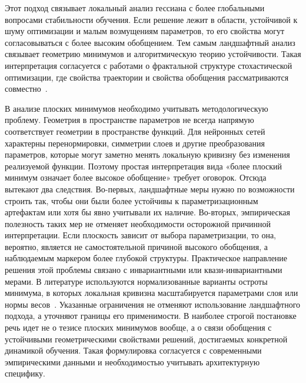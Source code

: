Этот подход связывает локальный анализ гессиана с более глобальными вопросами стабильности обучения.
Если решение лежит в области, устойчивой к шуму оптимизации и малым возмущениям параметров, то его свойства могут согласовываться с более высоким обобщением.
Тем самым ландшафтный анализ связывает геометрию минимумов и алгоритмическую теорию устойчивости.
Такая интерпретация согласуется с работами о фрактальной структуре стохастической оптимизации, где свойства траектории и свойства обобщения рассматриваются совместно~\cite{fractal2019sgd}.

В анализе плоских минимумов необходимо учитывать методологическую проблему. Геометрия в пространстве параметров не всегда напрямую соответствует геометрии в пространстве функций.
Для нейронных сетей характерны перенормировки, симметрии слоев и другие преобразования параметров, которые могут заметно менять локальную кривизну без изменения реализуемой функции.
Поэтому простая интерпретация вида «более плоский минимум означает более высокое обобщение» требует оговорок.
Отсюда вытекают два следствия.
Во-первых, ландшафтные меры нужно по возможности строить так, чтобы они были более устойчивы к параметризационным артефактам или хотя бы явно учитывали их наличие.
Во-вторых, эмпирическая полезность таких мер не отменяет необходимости осторожной причинной интерпретации.
Если плоскость зависит от выбора параметризации, то она, вероятно, является не самостоятельной причиной высокого обобщения, а наблюдаемым маркером более глубокой структуры.
Практическое направление решения этой проблемы связано с инвариантными или квази-инвариантными мерами. В литературе используются нормализованные варианты остроты минимума, в которых локальная кривизна масштабируется параметрами слоя или нормы весов~\cite{normalizedflat2019}.
Указанные ограничения не отменяют использование ландшафтного подхода, а уточняют границы его применимости.
В наиболее строгой постановке речь идет не о тезисе плоских минимумов вообще, а о связи обобщения с устойчивыми геометрическими свойствами решений, достигаемых конкретной динамикой обучения.
Такая формулировка согласуется с современными эмпирическими данными и необходимостью учитывать архитектурную специфику.

